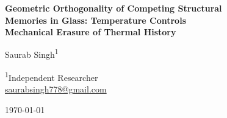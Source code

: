 \documentclass[12pt,a4paper]{article}
\begin{document}

\begin{titlepage}
\centering
\vspace*{1.5cm}

{\LARGE\bfseries Geometric Orthogonality of Competing Structural\\[6pt]
Memories in Glass: Temperature Controls\\[6pt]
Mechanical Erasure of Thermal History\par}

\vspace{1.4cm}

{\large Saurab Singh\textsuperscript{1}}

\vspace{0.6cm}

{\normalsize
\textsuperscript{1}Independent Researcher\\
\href{mailto:saurabsingh778@gmail.com}{saurabsingh778@gmail.com}
}

\vspace{1.2cm}

{\small \today}

\vspace{2.5cm}


\end{titlepage}
\end{document}
